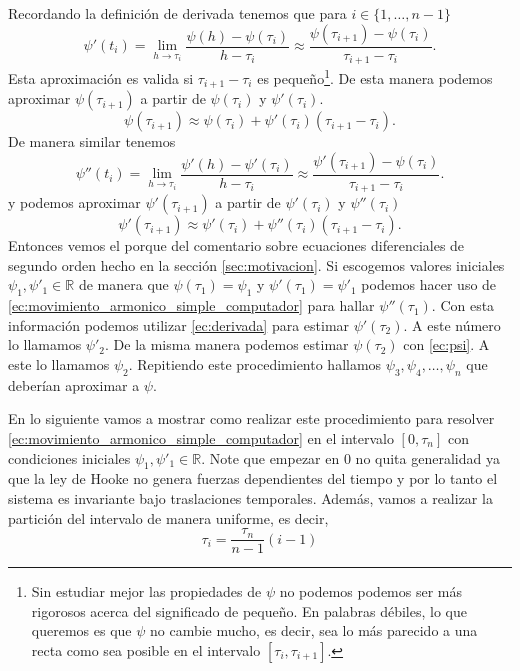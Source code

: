 \documentclass{article}
\begin{document}
Recordando la definición de derivada tenemos que para $i\in\{1,\dots,n-1\}$
\begin{equation}
\psi'(t_i)=\lim_{h\rightarrow\tau_i}\frac{\psi(h)-\psi(\tau_i)}{h-\tau_i}\approx\frac{\psi(\tau_{i+1})-\psi(\tau_i)}{\tau_{i+1}-\tau_{i}}.
\end{equation} 
Esta aproximación es valida si $\tau_{i+1}-\tau_i$ es pequeño\footnote{Sin estudiar mejor las propiedades de $\psi$ no podemos podemos ser más rigorosos acerca del significado de pequeño. En palabras débiles, lo que queremos es que $\psi$ no cambie mucho, es decir, sea lo más parecido a una recta como sea posible en el intervalo $[\tau_i,\tau_{i+1}]$.}. De esta manera podemos aproximar $\psi(\tau_{i+1})$ a partir de $\psi(\tau_i)$ y $\psi'(\tau_i)$.
\begin{equation}
\psi(\tau_{i+1})\approx\psi(\tau_i)+\psi'(\tau_i)(\tau_{i+1}-\tau_i).
\end{equation}
De manera similar tenemos
\begin{equation}\label{ec:psi}
\psi''(t_i)=\lim_{h\rightarrow\tau_i}\frac{\psi'(h)-\psi'(\tau_i)}{h-\tau_i}\approx\frac{\psi'(\tau_{i+1})-\psi(\tau_i)}{\tau_{i+1}-\tau_{i}}.
\end{equation} 
y podemos aproximar $\psi'(\tau_{i+1})$ a partir de $\psi'(\tau_i)$ y $\psi''(\tau_i)$
\begin{equation}\label{ec:derivada}
\psi'(\tau_{i+1})\approx\psi'(\tau_i)+\psi''(\tau_i)(\tau_{i+1}-\tau_i).
\end{equation}
Entonces vemos el porque del comentario sobre ecuaciones diferenciales de segundo orden hecho en la sección \ref{sec:motivacion}. Si escogemos valores iniciales $\psi_1,\psi'_1\in\mathbb{R}$ de manera que $\psi(\tau_1)=\psi_1$ y $\psi'(\tau_1)=\psi'_1$ podemos hacer uso de \eqref{ec:movimiento_armonico_simple_computador} para hallar $\psi''(\tau_1)$. Con esta información podemos utilizar \eqref{ec:derivada} para estimar $\psi'(\tau_2)$. A este número lo llamamos $\psi'_2$. De la misma manera podemos estimar  $\psi(\tau_2)$ con \eqref{ec:psi}. A este lo llamamos $\psi_2$. Repitiendo este procedimiento hallamos $\psi_3,\psi_4,\dots,\psi_n$ que deberían aproximar a $\psi$.

En lo siguiente vamos a mostrar como realizar este procedimiento para resolver \eqref{ec:movimiento_armonico_simple_computador} en el intervalo $[0,\tau_n]$ con condiciones iniciales $\psi_1,\psi'_1\in\mathbb{R}$. Note que empezar en $0$ no quita generalidad ya que la ley de Hooke no genera fuerzas dependientes del tiempo y por lo tanto el sistema es invariante bajo traslaciones temporales. Además, vamos a realizar la partición del intervalo de manera uniforme, es decir,
\begin{equation}
\tau_i=\frac{\tau_n}{n-1}(i-1)
\end{equation}
\end{document}
